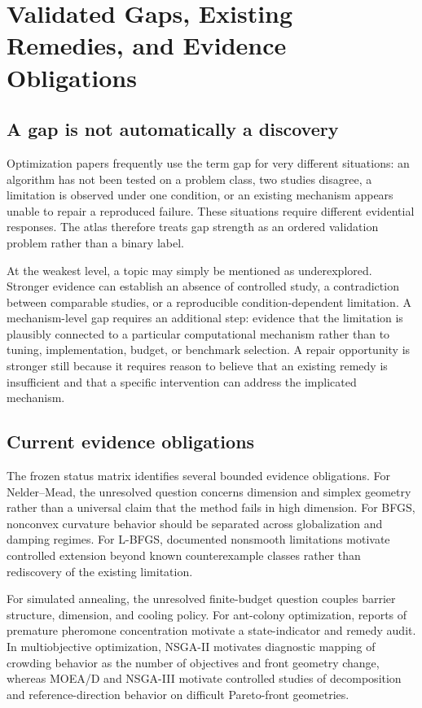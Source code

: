 \section{Validated Gaps, Existing Remedies, and Evidence Obligations}
\label{sec:gaps}

\subsection{A gap is not automatically a discovery}

Optimization papers frequently use the term gap for very different situations: an algorithm has not been tested on a problem class, two studies disagree, a limitation is observed under one condition, or an existing mechanism appears unable to repair a reproduced failure. These situations require different evidential responses. The atlas therefore treats gap strength as an ordered validation problem rather than a binary label.

At the weakest level, a topic may simply be mentioned as underexplored. Stronger evidence can establish an absence of controlled study, a contradiction between comparable studies, or a reproducible condition-dependent limitation. A mechanism-level gap requires an additional step: evidence that the limitation is plausibly connected to a particular computational mechanism rather than to tuning, implementation, budget, or benchmark selection. A repair opportunity is stronger still because it requires reason to believe that an existing remedy is insufficient and that a specific intervention can address the implicated mechanism.

\subsection{Current evidence obligations}

The frozen status matrix identifies several bounded evidence obligations. For Nelder--Mead, the unresolved question concerns dimension and simplex geometry rather than a universal claim that the method fails in high dimension. For BFGS, nonconvex curvature behavior should be separated across globalization and damping regimes. For L-BFGS, documented nonsmooth limitations motivate controlled extension beyond known counterexample classes rather than rediscovery of the existing limitation.

For simulated annealing, the unresolved finite-budget question couples barrier structure, dimension, and cooling policy. For ant-colony optimization, reports of premature pheromone concentration motivate a state-indicator and remedy audit. In multiobjective optimization, NSGA-II motivates diagnostic mapping of crowding behavior as the number of objectives and front geometry change, whereas MOEA/D and NSGA-III motivate controlled studies of decomposition and reference-direction behavior on difficult Pareto-front geometries.

